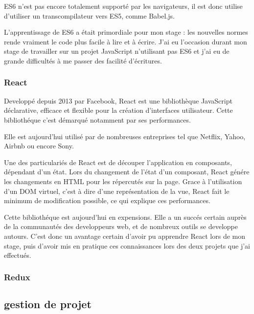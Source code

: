 \bigskip

ES6 n'est pas encore totalement supporté par les navigateurs, il est
donc utilise d'utiliser un transcompilateur vers ES5, comme Babel.js.

\bigskip

L'apprentissage de ES6 a était primordiale pour mon stage : les
nouvelles normes rende vraiment le code plus facile à lire et à écrire.
J'ai eu l'occasion durant mon stage de travailler sur un projet
JavaScript n'utilisant pas ES6 et j'ai eu de grande difficultés à me
passer des facilité d'écritures.

\bigskip

\subsubsection{React}\label{react}

\bigskip

Developpé depuis 2013 par Facebook, React est une bibliothèque
JavaScript déclarative, efficace et flexible pour la création
d'interfaces utilisateur. Cette bibliothéque c'est démarqué notamment
par ses performances.

\bigskip

Elle est aujourd'hui utilisé par de nombreuses entreprises tel que
Netflix, Yahoo, Airbnb ou encore Sony.

\bigskip

Une des particulariés de React est de découper l'application en
composants, dépendant d'un état. Lors du changement de l'état d'un
composant, React génére les changements en HTML pour les répercutés sur
la page. Grace à l'utilisation d'un DOM virtuel, c'est à dire d'une
représentation de la vue, React fait le minimum de modification
possible, ce qui explique ces performances.

\bigskip

Cette bibliothéque est aujourd'hui en expensions. Elle a un succés
certain auprès de la communautés des developpeurs web, et de nombreux
outils se developpe autours. C'est donc un avantage certain d'avoir pu
apprendre React lors de mon stage, puis d'avoir mis en pratique ces
connaissances lors des deux projets que j'ai effectués.

\bigskip

\subsubsection{Redux}\label{redux}

\subsection{gestion de projet}\label{gestion-de-projet}

